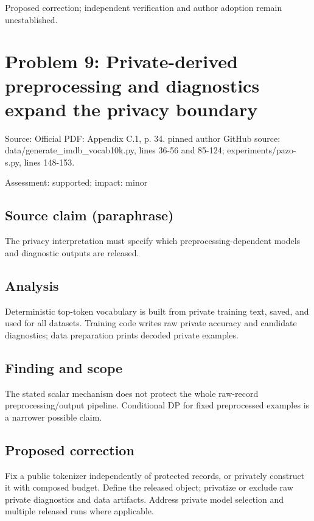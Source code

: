 \documentclass[11pt]{article}
\begin{document}
Proposed correction; independent verification and author adoption remain unestablished.

\section*{Problem 9: Private-derived preprocessing and diagnostics expand the privacy boundary}

Source: Official PDF: Appendix C.1, p. 34. pinned author GitHub source: data/generate\_imdb\_vocab10k.py, lines 36-56 and 85-124; experiments/pazo-s.py, lines 148-153.

Assessment: supported; impact: minor

\subsection*{Source claim (paraphrase)}

The privacy interpretation must specify which preprocessing-dependent models and diagnostic outputs are released.

\subsection*{Analysis}

Deterministic top-token vocabulary is built from private training text, saved, and used for all datasets. Training code writes raw private accuracy and candidate diagnostics; data preparation prints decoded private examples.

\subsection*{Finding and scope}

The stated scalar mechanism does not protect the whole raw-record preprocessing/output pipeline. Conditional DP for fixed preprocessed examples is a narrower possible claim.

\subsection*{Proposed correction}

Fix a public tokenizer independently of protected records, or privately construct it with composed budget. Define the released object; privatize or exclude raw private diagnostics and data artifacts. Address private model selection and multiple released runs where applicable.
\end{document}
